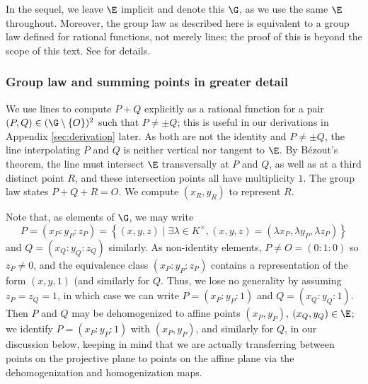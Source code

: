\documentclass[11pt,letterpaper]{article}
\theoremstyle{definition}
\newcommand{\6}{\mathbf}
\newcommand{\7}{\mathcal}
\begin{document}
In the sequel, we leave $\E$ implicit and denote this $\G$, as we use the same $\E$ throughout. Moreover, the group law as described here is equivalent to a group law defined for rational functions, not merely lines; the proof of this is beyond the scope of this text. See \cite{Silverman} for details.

\subsubsection{Group law and summing points in greater detail}\label{subsec:detail}

We use lines to compute $P + Q$ explicitly as a rational function for a pair $(P, Q) \in (\G \setminus \left\{O\right\})^2$ such that $P \neq \pm Q$; this is useful in our derivations in Appendix \ref{sec:derivation} later. As both are not the identity and $P \neq \pm Q$, the line interpolating $P$ and $Q$ is neither vertical nor tangent to $\E$. By B\'{e}zout's theorem, the line must intersect $\E$ transversally at $P$ and $Q$, as well as at a third distinct point $R$, and these intersection points all have multiplicity $1$. 
The group law states $P + Q + R = O$. 
We compute $(x_R, y_R)$ to represent $R$.


Note that, as elements of $\G$, we may write \[P = (x_P\!:y_P\!:z_P) = \left\{(x,y,z) \mid \exists \lambda \in K^\times, (x,y,z) = (\lambda x_P,\lambda y_P,\lambda z_P)\right\}\] and $Q = (x_Q\!:y_Q\!:z_Q)$ similarly. As non-identity elements, $P \neq O = (0\!:\!1\!:\!0)$ so $z_P \neq 0$, and the equivalence class $(x_P\!:y_P\!:z_P)$ contains a representation of the form $(x,y,1)$ (and similarly for $Q$. Thus, we lose no generality by assuming $z_P=z_Q=1$, in which case we can write $P = (x_P\!:y_P\!:1)$ and $Q=(x_Q\!:y_Q\!:1)$. Then $P$ and $Q$ may be dehomogenized to affine points $(x_P, y_P)$, $(x_Q, y_Q) \in \E$; we identify $P = (x_P\!:y_P\!:1)$ with $(x_P, y_P)$, and similarly for $Q$, in our discussion below, keeping in mind that we are actually transferring between points on the projective plane to points on the affine plane via the dehomogenization and homogenization maps.
\end{document}

